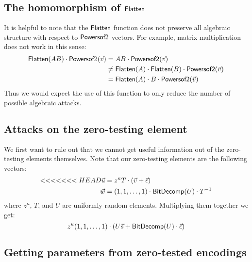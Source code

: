 \subsection{The homomorphism of $\mathsf{Flatten}$}

It is helpful to note that the $\mathsf{Flatten}$ function does not preserve all algebraic structure with respect to $\mathsf{Powersof2}$ vectors.  For example, matrix multiplication does not work in this sense:
\begin{align*}
\mathsf{Flatten}(AB)\cdot \mathsf{Powersof2}(\vec{v}) &= AB \cdot \mathsf{Powersof2}(\vec{v})\\
&\not= \mathsf{Flatten}(A)\cdot \mathsf{Flatten}(B)\cdot \mathsf{Powersof2}(\vec{v})\\ 
&= \mathsf{Flatten}(A)\cdot B\cdot \mathsf{Powersof2}(\vec{v})
\end{align*}
Thus we would expect the use of this function to only reduce the number of possible algebraic attacks.

\subsection{Attacks on the zero-testing element}

We first want to rule out that we cannot get useful information out of the zero-testing elements themselves.  Note that our zero-testing elements are the following vectors:
\begin{align*}
<<<<<<< HEAD
\vec{u} &= z^\kappa T\cdot (\vec{v} + \vec{\epsilon})\\
\vec{w} &= (1,1,\ldots, 1)\cdot\mathsf{BitDecomp}(U)\cdot T^{-1}
\end{align*}
where $z^\kappa$, $T$, and $U$ are uniformly random elements.  Multiplying them together we get:
$$z^\kappa (1,1,\ldots, 1)\cdot (U\vec{s} + \mathsf{BitDecomp}(U)\cdot\vec{\epsilon})$$

\subsection{Getting parameters from zero-tested encodings}


